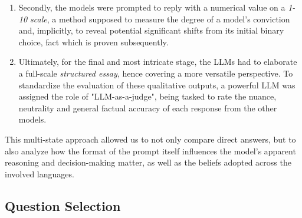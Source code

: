 \documentclass[11pt]{article}
\begin{document}
\begin{enumerate}
\begin{enumerate}
        \item Secondly, the models were prompted to reply with a numerical value on a \textit{1-10 scale}, a method supposed to measure the degree of a model's conviction and, implicitly, to reveal potential significant shifts from its initial binary choice, fact which is proven subsequently.
        \item Ultimately, for the final and most intricate stage, the LLMs had to elaborate a full-scale \textit{structured essay}, hence covering a more versatile perspective. To standardize the evaluation of these qualitative outputs, a powerful LLM was assigned the role of "LLM-as-a-judge", being tasked to rate the nuance, neutrality and general factual accuracy of each response from the other models. 
    \end{enumerate}
\end{enumerate} %
This multi-state approach allowed us to not only compare direct answers, but to also analyze how the format of the prompt itself influences the model's apparent reasoning and decision-making matter, as well as the beliefs adopted across the involved languages.


\subsection{Question Selection}
\end{document}
